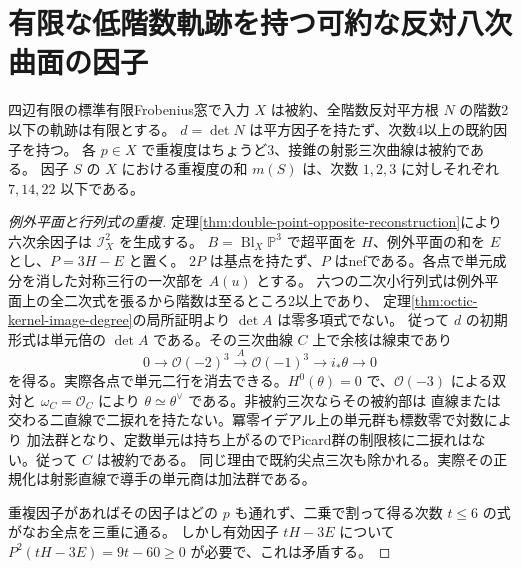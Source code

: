 \section{有限な低階数軌跡を持つ可約な反対八次曲面の因子}
\label{sec:reducible-octic-factors}
\begin{theorem}\label{thm:reducible-octic-factors}
四辺有限の標準有限Frobenius窓で入力 $X$ は被約、全階数反対平方根 $N$ の階数2以下の軌跡は有限とする。
$d=\det N$ は平方因子を持たず、次数4以上の既約因子を持つ。
各 $p\in X$ で重複度はちょうど3、接錐の射影三次曲線は被約である。
因子 $S$ の $X$ における重複度の和 $m(S)$ は、次数 $1,2,3$ に対しそれぞれ $7,14,22$ 以下である。
\end{theorem}
\begin{proof}[例外平面と行列式の重複]
定理\ref{thm:double-point-opposite-reconstruction}により六次余因子は $\mathcal I_X^2$ を生成する。
$B=\operatorname{Bl}_X\mathbb P^3$ で超平面を $H$、例外平面の和を $E$ とし、$P=3H-E$ と置く。
$2P$ は基点を持たず、$P$ はnefである。各点で単元成分を消した対称三行の一次部を $A(u)$ とする。
六つの二次小行列式は例外平面上の全二次式を張るから階数は至るところ2以上であり、
定理\ref{thm:octic-kernel-image-degree}の局所証明より $\det A$ は零多項式でない。
従って $d$ の初期形式は単元倍の $\det A$ である。その三次曲線 $C$ 上で余核は線束であり
\[
 0\longrightarrow\mathcal O(-2)^3\xrightarrow{A}\mathcal O(-1)^3
 \longrightarrow i_*\theta\longrightarrow0
\]
を得る。実際各点で単元二行を消去できる。$H^0(\theta)=0$ で、$\mathcal O(-3)$ による双対と
$\omega_C=\mathcal O_C$ により $\theta\simeq\theta^\vee$ である。非被約三次ならその被約部は
直線または交わる二直線で二捩れを持たない。冪零イデアル上の単元群も標数零で対数により
加法群となり、定数単元は持ち上がるのでPicard群の制限核に二捩れはない。従って $C$ は被約である。
同じ理由で既約尖点三次も除かれる。実際その正規化は射影直線で導手の単元商は加法群である。

重複因子があればその因子はどの $p$ も通れず、二乗で割って得る次数 $t\le6$ の式がなお全点を三重に通る。
しかし有効因子 $tH-3E$ について $P^2(tH-3E)=9t-60\ge0$ が必要で、これは矛盾する。
\end{proof}
